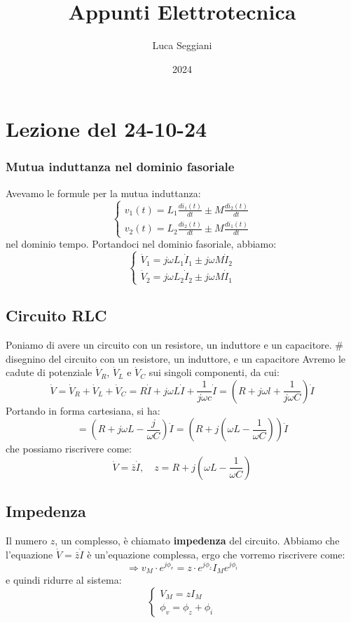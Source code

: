 \documentclass[a4paper,11pt]{article}
\title{Appunti Elettrotecnica}
\author{Luca Seggiani}
\date{2024}
\begin{document}
\section{Lezione del 24-10-24}

\thispagestyle{empty}
\pagestyle{fancy}

\subsubsection{Mutua induttanza nel dominio fasoriale}
Avevamo le formule per la mutua induttanza:
\[
	\begin{cases}
		v_1(t) = L_1 \frac{d i_1(t)}{dt} \pm M \frac{d i_2(t)}{dt} \\
		v_2(t) = L_2 \frac{d i_2(t)}{dt} \pm M \frac{d i_1(t)}{dt}	
	\end{cases}
\]
nel dominio tempo.
Portandoci nel dominio fasoriale, abbiamo:
\[
	\begin{cases}
		\dot{V}_1 = j\omega L_1 \dot{I}_1	\pm j\omega M \dot{I}_2 \\
		\dot{V}_2 = j\omega L_2 \dot{I}_2	\pm j\omega M \dot{I}_1
	\end{cases}
\]

\subsection{Circuito RLC}
Poniamo di avere un circuito con un resistore, un induttore e un capacitore.
# disegnino del circuito con un resistore, un induttore, e un capacitore
Avremo le cadute di potenziale $\dot{V}_R$, $\dot{V}_L$ e $\dot{V}_C$ sui singoli componenti, da cui:
$$
\dot{V} = \dot{V}_R + \dot{V}_L + \dot{V}_C = R \dot{I} + j\omega L \dot{I} + \frac{1}{j \omega c} \dot{I} = \left( R + j\omega l+ \frac{1}{j\omega C} \right) \dot{I}
$$
Portando in forma cartesiana, si ha:
$$
= (R + j\omega L - \frac{j}{\omega C}) \dot{I} = \left( R + j \left( \omega L - \frac{1}{\omega C} \right) \right) \dot{I}
$$
che possiamo riscrivere come:
$$
\dot{V} = \bar{z} \dot{I}, \quad z = R + j \left( \omega L - \frac{1}{\omega C} \right)
$$

\subsection{Impedenza}
Il numero $z$, un complesso, è chiamato \textbf{impedenza} del circuito.
Abbiamo che l'equazione $\dot{V} = \bar{z} \dot{I}$ è un'equazione complessa, ergo che vorremo riscrivere come:
$$
\Rightarrow v_M \cdot e^{j \phi_v} = z \cdot e^{j \phi_z} I_M e^{j \phi_i}
$$
e quindi ridurre al sistema:
\[
	\begin{cases}
		V_M = z I_M \\ 
		\phi_v = \phi_z + \phi_i
	\end{cases}
\]
\end{document}
